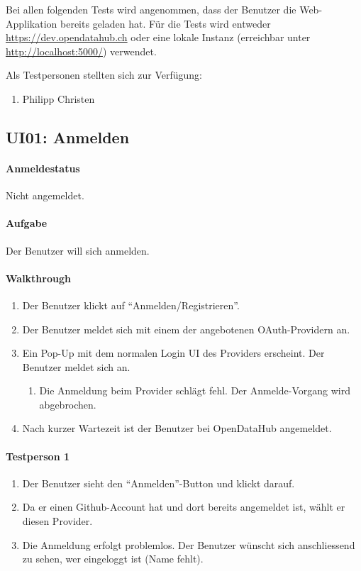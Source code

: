 Bei allen folgenden Tests wird angenommen, dass der Benutzer die Web-Applikation bereits geladen hat. Für die Tests wird entweder \url{https://dev.opendatahub.ch} oder eine lokale Instanz (erreichbar unter \url{http://localhost:5000/}) verwendet.

Als Testpersonen stellten sich zur Verfügung:
\begin{enumerate}
\item Philipp Christen
\end{enumerate}

\subsection{UI01: Anmelden}
\paragraph{Anmeldestatus} Nicht angemeldet.

\paragraph{Aufgabe} Der Benutzer will sich anmelden.

\paragraph{Walkthrough}
\begin{enumerate}
\item Der Benutzer klickt auf ``Anmelden/Registrieren''.
\item Der Benutzer meldet sich mit einem der angebotenen OAuth-Providern an.
\item Ein Pop-Up mit dem normalen Login UI des Providers erscheint. Der Benutzer meldet sich an.
  \begin{enumerate}[label=\labelenumi\alph*.]
  \item Die Anmeldung beim Provider schlägt fehl. Der Anmelde-Vorgang wird abgebrochen.
  \end{enumerate}
\item Nach kurzer Wartezeit ist der Benutzer bei OpenDataHub angemeldet.
\end{enumerate}

\paragraph{Testperson 1}
\begin{enumerate}
\item Der Benutzer sieht den ``Anmelden''-Button und klickt darauf.
\item Da er einen Github-Account hat und dort bereits angemeldet ist, wählt er diesen Provider.
\item Die Anmeldung erfolgt problemlos. Der Benutzer wünscht sich anschliessend zu sehen, wer eingeloggt ist (Name fehlt).
\end{enumerate}

